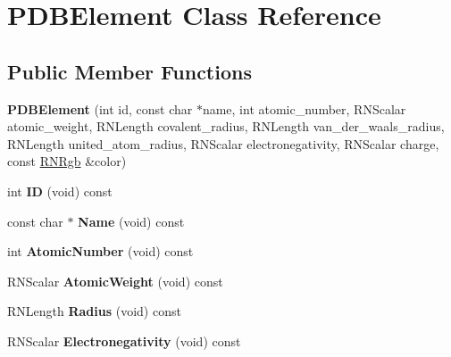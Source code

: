 \hypertarget{class_p_d_b_element}{}\section{P\+D\+B\+Element Class Reference}
\label{class_p_d_b_element}
\subsection*{Public Member Functions}
\begin{DoxyCompactItemize}
\item 
{\bfseries P\+D\+B\+Element} (int id, const char $\ast$name, int atomic\+\_\+number, R\+N\+Scalar atomic\+\_\+weight, R\+N\+Length covalent\+\_\+radius, R\+N\+Length van\+\_\+der\+\_\+waals\+\_\+radius, R\+N\+Length united\+\_\+atom\+\_\+radius, R\+N\+Scalar electronegativity, R\+N\+Scalar charge, const \hyperlink{class_r_n_rgb}{R\+N\+Rgb} \&color)\hypertarget{class_p_d_b_element_a9a142143dd59663a758bd4232157b006}{}\label{class_p_d_b_element_a9a142143dd59663a758bd4232157b006}

\item 
int {\bfseries ID} (void) const \hypertarget{class_p_d_b_element_a0a4c2d29bbbab410b5c41f11379b46a8}{}\label{class_p_d_b_element_a0a4c2d29bbbab410b5c41f11379b46a8}

\item 
const char $\ast$ {\bfseries Name} (void) const \hypertarget{class_p_d_b_element_a0c49a2ffb47f14e64493a5930d8f505b}{}\label{class_p_d_b_element_a0c49a2ffb47f14e64493a5930d8f505b}

\item 
int {\bfseries Atomic\+Number} (void) const \hypertarget{class_p_d_b_element_ad0017251c4df3fef67dd476604710cbf}{}\label{class_p_d_b_element_ad0017251c4df3fef67dd476604710cbf}

\item 
R\+N\+Scalar {\bfseries Atomic\+Weight} (void) const \hypertarget{class_p_d_b_element_a2e26e6fde2a433e9bf5fe00a639b2b24}{}\label{class_p_d_b_element_a2e26e6fde2a433e9bf5fe00a639b2b24}

\item 
R\+N\+Length {\bfseries Radius} (void) const \hypertarget{class_p_d_b_element_abf71cf71b3834518581ca972ff3d149a}{}\label{class_p_d_b_element_abf71cf71b3834518581ca972ff3d149a}

\item 
R\+N\+Scalar {\bfseries Electronegativity} (void) const \hypertarget{class_p_d_b_element_a8539662ad56c5770ab6482e7ce69f13f}{}\label{class_p_d_b_element_a8539662ad56c5770ab6482e7ce69f13f}


\end{DoxyCompactItemize}
